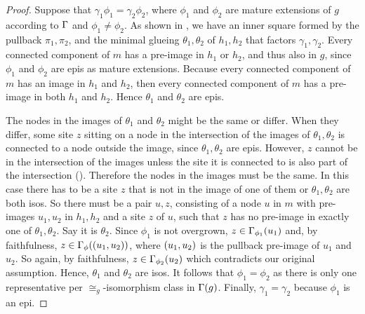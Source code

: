 \begin{proof}
  Suppose that $\gamma_1 \phi_1 = \gamma_2 \phi_2$,
  where $\phi_1$ and $\phi_2$ are mature extensions of $g$
  according to $\Gamma$ and $\phi_1 \neq \phi_2$.
  As shown in ,
  we have an inner square formed by the pullback $\pi_1,\pi_2$,
  and the minimal glueing $\theta_1,\theta_2$ of $h_1,h_2$
  that factors $\gamma_1,\gamma_2$.
  Every connected component of $m$
  has a pre-image in $h_1$ or $h_2$,
  and thus also in $g$,
  since $\phi_1$ and $\phi_2$ are epis
  as mature extensions.
  Because every connected component of $m$
  has an image in $h_1$ and $h_2$,
  then every connected component of $m$
  has a pre-image in both $h_1$ and $h_2$.
  Hence $\theta_1$ and $\theta_2$ are epis.

  The nodes in the images of $\theta_1$ and $\theta_2$
  might be the same or differ.
  When they differ, some site $z$ sitting on a node
  in the intersection of the images of $\theta_1,\theta_2$
  is connected to a node outside the image,
  since $\theta_1,\theta_2$ are epis.
  However, $z$ cannot be in the intersection of the images
  unless the site it is connected to is also part of the intersection
  ().
  Therefore the nodes in the images must be the same.
  In this case there has to be a site $z$
  that is not in the image of one of them
  or $\theta_1,\theta_2$ are both isos.
  So there must be a pair $u,z$,
  consisting of a node $u$ in $m$
  with pre-images $u_1,u_2$ in $h_1,h_2$
  and a site $z$ of $u$,
  such that $z$ has no pre-image
  in exactly one of $\theta_1,\theta_2$.
  Say it is $\theta_2$.
  Since $\phi_1$ is not overgrown,
  $z \in \Gamma_{\phi_1}(u_1)$ and, by faithfulness,
  $z \in \Gamma_\phi(\left(u_1,u_2\right))$,
  where $\left(u_1,u_2\right)$ is
  the pullback pre-image of $u_1$ and $u_2$.
  So again, by faithfulness, $z \in \Gamma_{\phi_2}(u_2)$
  which contradicts our original assumption.
  Hence, $\theta_1$ and $\theta_2$ are isos.
  It follows that $\phi_1 = \phi_2$ as there is only
  one representative per $\cong_g$-isomorphism class in $\Gamma(g)$.
  Finally, $\gamma_1 = \gamma_2$ because $\phi_1$ is an epi.
\end{proof}

